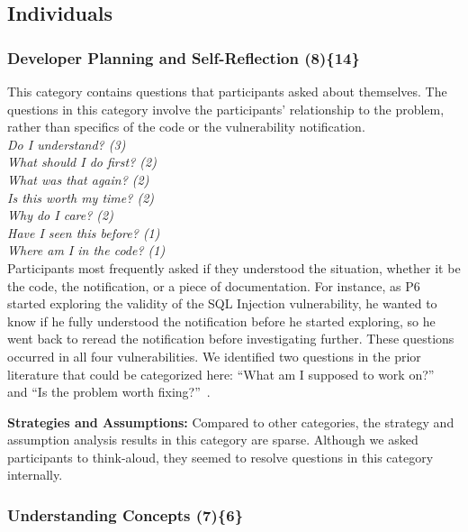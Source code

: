\documentclass[10pt,journal,compsoc]{IEEEtran}
\begin{document}
\subsection{Individuals}

\label{sec:results-i}

\subsubsection{Developer Planning and Self-Reflection (8)\{14\}}
\label{dpr}
 
This category contains questions that participants asked about themselves.
The questions in this category involve the participants' relationship to the problem, rather than specifics of the code or the vulnerability notification.
\\

\noindent\emph{Do I understand? (3)} \\
\emph{What should I do first? (2)} \\
\emph{What was that again? (2)} \\
\emph{Is this worth my time? (2)} \\
\emph{Why do I care? (2)} \\
\emph{Have I seen this before? (1)} \\
\emph{Where am I in the code? (1)} 
\\

Participants most frequently asked if they understood the situation, whether it be the code, the notification, or a piece of documentation. 
For instance, as P6 started exploring the validity of the SQL Injection vulnerability, he wanted to know if he fully understood the notification before he started exploring, so he went back to reread the notification before investigating further.
These questions occurred in all four vulnerabilities.
We identified two questions in the prior literature that could be categorized here:
``What am I supposed to work on?''~\cite{fritz2010using} and
``Is the problem worth fixing?''~\cite{Ko:2007:information}.


\textbf{Strategies and Assumptions:}
Compared to other categories, the strategy and assumption analysis results in this category are sparse.
Although we asked participants to think-aloud, they seemed to resolve questions in this category internally. 



\subsubsection{Understanding Concepts (7)\{6\}}\label{uc}
\end{document}
